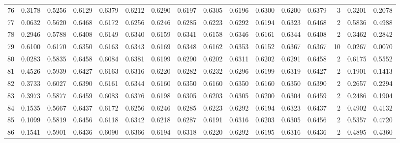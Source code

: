 \begin{tabular}{lrrrrrrrrrrrrrrr}
76  &      0.3178 &  0.5256 &  0.6129 &  0.6379 &  0.6212 &  0.6290 &  0.6197 &  0.6305 &  0.6196 &  0.6300 &   0.6200 &     0.6379 &      3 &                    0.3201 &                     0.2078 \\
77  &      0.0632 &  0.5620 &  0.6468 &  0.6172 &  0.6256 &  0.6246 &  0.6285 &  0.6223 &  0.6292 &  0.6194 &   0.6323 &     0.6468 &      2 &                    0.5836 &                     0.4988 \\
78  &      0.2946 &  0.5788 &  0.6408 &  0.6149 &  0.6340 &  0.6159 &  0.6341 &  0.6158 &  0.6346 &  0.6161 &   0.6344 &     0.6408 &      2 &                    0.3462 &                     0.2842 \\
79  &      0.6100 &  0.6170 &  0.6350 &  0.6163 &  0.6343 &  0.6169 &  0.6348 &  0.6162 &  0.6353 &  0.6152 &   0.6367 &     0.6367 &     10 &                    0.0267 &                     0.0070 \\
80  &      0.0283 &  0.5835 &  0.6458 &  0.6084 &  0.6381 &  0.6199 &  0.6290 &  0.6202 &  0.6311 &  0.6202 &   0.6291 &     0.6458 &      2 &                    0.6175 &                     0.5552 \\
81  &      0.4526 &  0.5939 &  0.6427 &  0.6163 &  0.6316 &  0.6220 &  0.6282 &  0.6232 &  0.6296 &  0.6199 &   0.6319 &     0.6427 &      2 &                    0.1901 &                     0.1413 \\
82  &      0.3733 &  0.6027 &  0.6390 &  0.6161 &  0.6344 &  0.6160 &  0.6350 &  0.6160 &  0.6350 &  0.6160 &   0.6350 &     0.6390 &      2 &                    0.2657 &                     0.2294 \\
83  &      0.3973 &  0.5877 &  0.6459 &  0.6083 &  0.6376 &  0.6198 &  0.6305 &  0.6203 &  0.6305 &  0.6200 &   0.6304 &     0.6459 &      2 &                    0.2486 &                     0.1904 \\
84  &      0.1535 &  0.5667 &  0.6437 &  0.6172 &  0.6256 &  0.6246 &  0.6285 &  0.6223 &  0.6292 &  0.6194 &   0.6323 &     0.6437 &      2 &                    0.4902 &                     0.4132 \\
85  &      0.1099 &  0.5819 &  0.6456 &  0.6118 &  0.6342 &  0.6218 &  0.6287 &  0.6191 &  0.6316 &  0.6203 &   0.6305 &     0.6456 &      2 &                    0.5357 &                     0.4720 \\
86  &      0.1541 &  0.5901 &  0.6436 &  0.6090 &  0.6366 &  0.6194 &  0.6318 &  0.6220 &  0.6292 &  0.6195 &   0.6316 &     0.6436 &      2 &                    0.4895 &                     0.4360 \\

\end{tabular}
